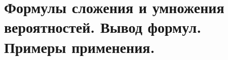 \documentclass[polytech/stats/exam-2023/stats-exam-2023.tex]{subfiles}
\begin{document}
\section{Формулы сложения и умножения вероятностей. Вывод формул. Примеры применения.}
\end{document}
